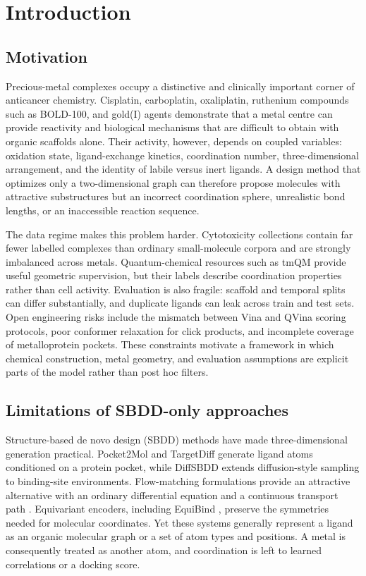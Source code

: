 \documentclass[10pt]{article}
\begin{document}
\section{Introduction}

\subsection{Motivation}

Precious-metal complexes occupy a distinctive and clinically important corner of anticancer chemistry. Cisplatin, carboplatin, oxaliplatin, ruthenium compounds such as BOLD-100, and gold(I) agents demonstrate that a metal centre can provide reactivity and biological mechanisms that are difficult to obtain with organic scaffolds alone. Their activity, however, depends on coupled variables: oxidation state, ligand-exchange kinetics, coordination number, three-dimensional arrangement, and the identity of labile versus inert ligands. A design method that optimizes only a two-dimensional graph can therefore propose molecules with attractive substructures but an incorrect coordination sphere, unrealistic bond lengths, or an inaccessible reaction sequence.

The data regime makes this problem harder. Cytotoxicity collections contain far fewer labelled complexes than ordinary small-molecule corpora and are strongly imbalanced across metals. Quantum-chemical resources such as tmQM provide useful geometric supervision, but their labels describe coordination properties rather than cell activity. Evaluation is also fragile: scaffold and temporal splits can differ substantially, and duplicate ligands can leak across train and test sets. Open engineering risks include the mismatch between Vina and QVina scoring protocols, poor conformer relaxation for click products, and incomplete coverage of metalloprotein pockets. These constraints motivate a framework in which chemical construction, metal geometry, and evaluation assumptions are explicit parts of the model rather than post hoc filters.

\subsection{Limitations of SBDD-only approaches}

Structure-based de novo design (SBDD) methods have made three-dimensional generation practical. Pocket2Mol and TargetDiff generate ligand atoms conditioned on a protein pocket, while DiffSBDD extends diffusion-style sampling to binding-site environments. Flow-matching formulations provide an attractive alternative with an ordinary differential equation and a continuous transport path \cite{lipman2023flow}. Equivariant encoders, including EquiBind \cite{peng2022equibind}, preserve the symmetries needed for molecular coordinates. Yet these systems generally represent a ligand as an organic molecular graph or a set of atom types and positions. A metal is consequently treated as another atom, and coordination is left to learned correlations or a docking score.
\end{document}
